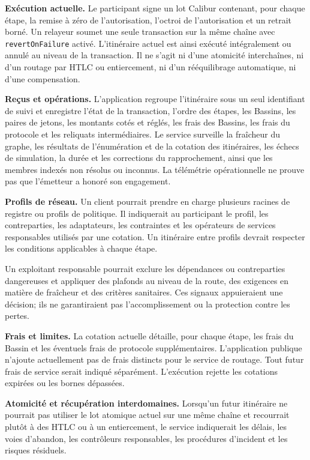 \documentclass[11pt]{article}
\begin{document}
\textbf{Exécution actuelle.} Le participant signe un lot Calibur contenant, pour chaque étape, la remise à zéro de l'autorisation, l'octroi de l'autorisation et un retrait borné. Un relayeur soumet une seule transaction sur la même chaîne avec \texttt{revertOnFailure} activé. L'itinéraire actuel est ainsi exécuté intégralement ou annulé au niveau de la transaction. Il ne s'agit ni d'une atomicité interchaînes, ni d'un routage par HTLC ou entiercement, ni d'un rééquilibrage automatique, ni d'une compensation.

\textbf{Reçus et opérations.} L'application regroupe l'itinéraire sous un seul identifiant de suivi et enregistre l'état de la transaction, l'ordre des étapes, les Bassins, les paires de jetons, les montants cotés et réglés, les frais des Bassins, les frais du protocole et les reliquats intermédiaires. Le service surveille la fraîcheur du graphe, les résultats de l'énumération et de la cotation des itinéraires, les échecs de simulation, la durée et les corrections du rapprochement, ainsi que les membres indexés non résolus ou inconnus. La télémétrie opérationnelle ne prouve pas que l'émetteur a honoré son engagement.

\textbf{Profils de réseau.} Un client pourrait prendre en charge plusieurs racines de registre ou profils de politique. Il indiquerait au participant le profil, les contreparties, les adaptateurs, les contraintes et les opérateurs de services responsables utilisés par une cotation. Un itinéraire entre profils devrait respecter les conditions applicables à chaque étape.

Un exploitant responsable pourrait exclure les dépendances ou contreparties dangereuses et appliquer des plafonds au niveau de la route, des exigences en matière de fraîcheur et des critères sanitaires. Ces signaux appuieraient une décision; ils ne garantiraient pas l'accomplissement ou la protection contre les pertes.

\textbf{Frais et limites.} La cotation actuelle détaille, pour chaque étape, les frais du Bassin et les éventuels frais de protocole supplémentaires. L'application publique n'ajoute actuellement pas de frais distincts pour le service de routage. Tout futur frais de service serait indiqué séparément. L'exécution rejette les cotations expirées ou les bornes dépassées.

\textbf{Atomicité et récupération interdomaines.} Lorsqu'un futur itinéraire ne pourrait pas utiliser le lot atomique actuel sur une même chaîne et recourrait plutôt à des HTLC ou à un entiercement, le service indiquerait les délais, les voies d'abandon, les contrôleurs responsables, les procédures d'incident et les risques résiduels.
\end{document}
